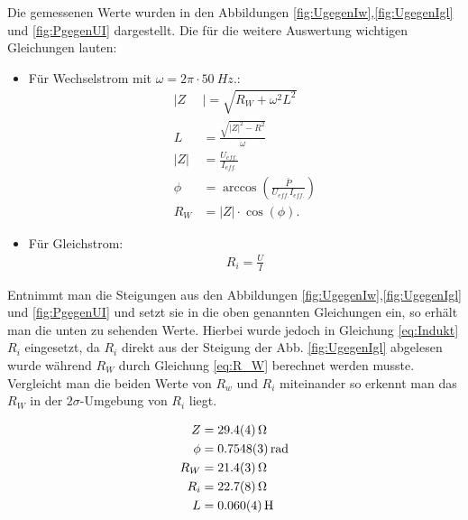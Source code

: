 Die gemessenen Werte wurden in den Abbildungen \ref{fig:UgegenIw},\ref{fig:UgegenIgl} und \ref{fig:PgegenUI} dargestellt.
Die für die weitere Auswertung wichtigen Gleichungen lauten:
\begin{itemize}
 \item Für Wechselstrom mit $\omega=2\pi \cdot \SI{50}{Hz}.$:
\begin{align}
	|Z&|=\sqrt{R_W + \omega^2L^2}\\
	L&=\frac{\sqrt{|Z|^2-R^2}}{\omega}\\
	\label{eq:Indukt}
	|Z|&=\frac{U_{eff.}}{I_{eff.}}\\
	\phi &= \arccos\left(\frac{\bar{P}}{U_{eff.}I_{eff.}}\right)\\
	R_W&=|Z|\cdot \cos(\phi)	\label{eq:R_W}.
\end{align}
\item Für Gleichstrom:
\begin{align}
	R_i=\frac{U}{I}
\end{align}
\end{itemize}
Entnimmt man die Steigungen aus den Abbildungen \ref{fig:UgegenIw},\ref{fig:UgegenIgl} und \ref{fig:PgegenUI} und setzt sie in die oben genannten Gleichungen ein, so erhält man die unten zu sehenden Werte. Hierbei wurde jedoch in Gleichung \ref{eq:Indukt} $R_i$ eingesetzt, da $R_i$ direkt aus der Steigung der Abb. \ref{fig:UgegenIgl} abgelesen wurde während $R_W$ durch Gleichung \ref{eq:R_W} berechnet werden musste. Vergleicht man die beiden Werte von $R_w$ und $R_i$ miteinander so erkennt man das  $R_W$ in der $2\sigma$-Umgebung von $R_i$ liegt. 

\begin{align}
		Z &= \SI{29.4+-0.4}{\ohm}\\
		\phi &= \SI{0.7548+-0.0003}{rad}\\
		R_W &= \SI{21.4+-0.3}{\ohm}\\
		R_i &= \SI{22.7+-0.8}{\ohm}\\
		L &= \SI{0,060+-0,004}{H}
\end{align}
